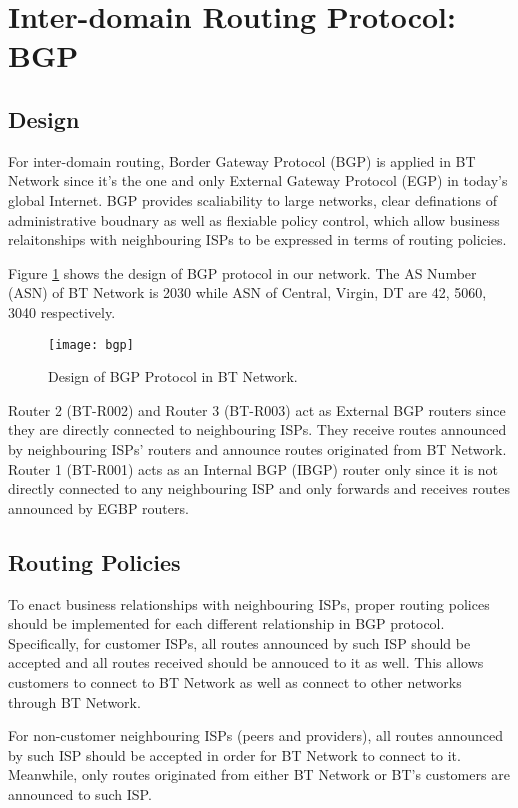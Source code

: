 \section{Inter-domain Routing Protocol: BGP}
\label{sec:bgp}

\subsection{Design}
For inter-domain routing, Border Gateway Protocol (BGP)\citep{rfc4271} is applied in BT Network since it's the one and only External Gateway Protocol (EGP) in today's global Internet. BGP provides scaliability to large networks, clear definations of administrative boudnary as well as flexiable policy control, which allow business relaitonships with neighbouring ISPs to be expressed in terms of routing policies.

Figure \ref{fig:bgp} shows the design of BGP protocol in our network. The AS Number (ASN) of BT Network is 2030 while ASN of Central, Virgin, DT are 42, 5060, 3040 respectively. 

\begin{figure}[ht!]
    \centering
    \texttt{[image: bgp]}
    \caption{Design of BGP Protocol in BT Network.}
    \label{fig:bgp}
\end{figure}

Router 2 (BT-R002) and Router 3 (BT-R003) act as External BGP routers since they are directly connected to neighbouring ISPs. They receive routes announced by neighbouring ISPs' routers and announce routes originated from BT Network.
Router 1 (BT-R001) acts as an Internal BGP (IBGP) router only since it is not directly connected to any neighbouring ISP and only forwards and receives routes announced by EGBP routers.




\subsection{Routing Policies}

To enact business relationships with neighbouring ISPs, proper routing polices should be implemented for each different relationship in BGP protocol. 
Specifically, for customer ISPs, all routes announced by such ISP should be accepted and all routes received should be annouced to it as well. This allows customers to connect to BT Network as well as connect to other networks through BT Network.

For non-customer neighbouring ISPs (peers and providers), all routes announced by such ISP should be accepted in order for BT Network to connect to it. Meanwhile, only routes originated from either BT Network or BT's customers are announced to such ISP.

